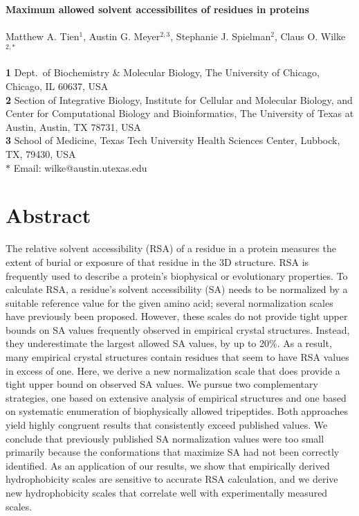 \documentclass[11pt]{article}
\date{}
\begin{document}
\begin{flushleft}
{\Large\textbf{Maximum allowed solvent accessibilites of residues in proteins}}
\\
\mbox{}\\
Matthew A. Tien$^1$,
Austin G. Meyer$^{2,3}$,
Stephanie J. Spielman$^{2}$,
Claus O. Wilke$^{2,\ast}$
\\
\mbox{}\\
\textbf{1} Dept.\ of Biochemistry \& Molecular Biology, The University of Chicago, Chicago, IL 60637, USA
\\
\textbf{2} Section of Integrative Biology, Institute for Cellular and Molecular Biology, and Center for Computational Biology and Bioinformatics, The University of Texas at Austin, Austin, TX 78731, USA
\\
\textbf{3} School of Medicine, Texas Tech University Health Sciences Center, Lubbock, TX, 79430, USA
\\
$\ast$ Email: wilke@austin.utexas.edu
\end{flushleft}





\section*{Abstract}
The relative solvent accessibility (RSA) of a residue in a protein measures the extent of burial or exposure of that residue in the 3D structure. RSA is frequently used to describe a protein's biophysical or evolutionary properties. To calculate RSA, a residue's solvent accessibility (SA) needs to be normalized by a suitable reference value for the given amino acid; several normalization scales have previously been proposed. However, these scales do not provide tight upper bounds on SA values frequently observed in empirical crystal structures. Instead, they underestimate the largest allowed SA values, by up to 20\%. As a result, many empirical crystal structures contain residues that seem to have RSA values in excess of one. Here, we derive a new normalization scale that does provide a tight upper bound on observed SA values. We pursue two complementary strategies, one based on extensive analysis of empirical structures and one based on systematic enumeration of biophysically allowed tripeptides. Both approaches yield highly congruent results that consistently exceed published values. We conclude that previously published SA normalization values were too small primarily because the conformations that maximize SA had not been correctly identified. As an application of our results, we show that empirically derived hydrophobicity scales are sensitive to accurate RSA calculation, and we derive new hydrophobicity scales that correlate well with experimentally measured scales.
\end{document}
